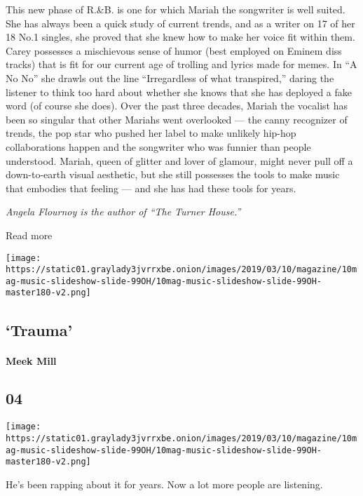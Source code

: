This new phase of R.\&B. is one for which Mariah the songwriter is well
suited. She has always been a quick study of current trends, and as a
writer on 17 of her 18 No.1 singles, she proved that she knew how to
make her voice fit within them. Carey possesses a mischievous sense of
humor (best employed on Eminem diss tracks) that is fit for our current
age of trolling and lyrics made for memes. In ``A No No'' she drawls out
the line ``Irregardless of what transpired,'' daring the listener to
think too hard about whether she knows that she has deployed a fake word
(of course she does). Over the past three decades, Mariah the vocalist
has been so singular that other Mariahs went overlooked --- the canny
recognizer of trends, the pop star who pushed her label to make unlikely
hip-hop collaborations happen and the songwriter who was funnier than
people understood. Mariah, queen of glitter and lover of glamour, might
never pull off a down-to-earth visual aesthetic, but she still possesses
the tools to make music that embodies that feeling --- and she has had
these tools for years.

\emph{Angela Flournoy is the author of ``The Turner House.''}

Read more

\texttt{[image: https://static01.graylady3jvrrxbe.onion/images/2019/03/10/magazine/10mag-music-slideshow-slide-99OH/10mag-music-slideshow-slide-99OH-master180-v2.png]}

\hypertarget{--trauma}{%
\subsection{\texorpdfstring{ `Trauma'}{  `Trauma'}}\label{--trauma}}

\hypertarget{meek-mill}{%
\paragraph{Meek Mill}\label{meek-mill}}

\hypertarget{04}{%
\subsection{04}\label{04}}

\texttt{[image: https://static01.graylady3jvrrxbe.onion/images/2019/03/10/magazine/10mag-music-slideshow-slide-99OH/10mag-music-slideshow-slide-99OH-master180-v2.png]}

He's been rapping about it for years. Now a lot more people are
listening.

